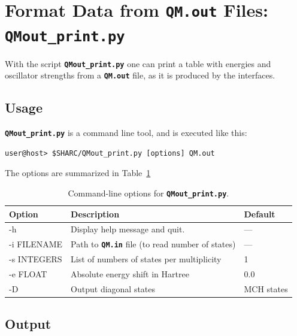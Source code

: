 \documentclass[a4paper,10pt,DIV=15,openany]{scrbook}
\newcommand{\ttt}[1]{\textbf{\texttt{#1}}}
\begin{document}

\section{Format Data from \ttt{QM.out} Files: \ttt{QMout\_print.py}}\label{sec:QMout_print.py}

With the script \ttt{QMout\_print.py} one can print a table with energies and oscillator strengths from a \ttt{QM.out} file, as it is produced by the interfaces.

\subsection{Usage}

\ttt{QMout\_print.py} is a command line tool, and is executed like this:
\begin{verbatim}
user@host> $SHARC/QMout_print.py [options] QM.out
\end{verbatim}
The options are summarized in Table~\ref{tab:QMoutprint_options}

\begin{table}[htb]
  \centering
  \caption{Command-line options for \ttt{QMout\_print.py}. }
  \label{tab:QMoutprint_options}
  \begin{tabular}{>{\ttfamily}lll}
    \hline
    \rmfamily Option         &Description    &Default\\
    \hline
    -h          &Display help message and quit.         &---       \\
    -i FILENAME &Path to \ttt{QM.in} file (to read number of states)    &---\\
    -s INTEGERS &List of numbers of states per multiplicity             &1\\
    -e FLOAT    &Absolute energy shift in Hartree                       &0.0\\
    -D          &Output diagonal states                                 &MCH states\\
    \hline
  \end{tabular}
\end{table}

\subsection{Output}
\end{document}
